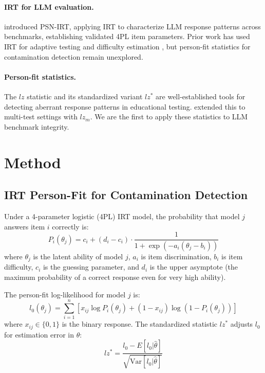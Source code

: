 \documentclass[11pt]{article}
\begin{document}
\paragraph{IRT for LLM evaluation.}
\citet{psnirt2026} introduced PSN-IRT, applying IRT to characterize LLM response patterns across benchmarks, establishing validated 4PL item parameters.
Prior work has used IRT for adaptive testing \citep{zhuang2023efficiently} and difficulty estimation \citep{lalor2019learning}, but person-fit statistics for contamination detection remain unexplored.

\paragraph{Person-fit statistics.}
The $lz$ statistic \citep{drasgow1985appropriateness} and its standardized variant $lz^*$ \citep{snijders2001} are well-established tools for detecting aberrant response patterns in educational testing.
\citet{hong2021} extended this to multi-test settings with $lz_m$.
We are the first to apply these statistics to LLM benchmark integrity.

\section{Method}
\label{sec:method}

\subsection{IRT Person-Fit for Contamination Detection}

Under a 4-parameter logistic (4PL) IRT model, the probability that model $j$ answers item $i$ correctly is:
\begin{equation}
P_i(\theta_j) = c_i + (d_i - c_i) \cdot \frac{1}{1 + \exp(-a_i(\theta_j - b_i))}
\end{equation}
where $\theta_j$ is the latent ability of model $j$, $a_i$ is item discrimination, $b_i$ is item difficulty, $c_i$ is the guessing parameter, and $d_i$ is the upper asymptote (the maximum probability of a correct response even for very high ability).

The person-fit log-likelihood for model $j$ is:
\begin{equation}
l_0(\theta_j) = \sum_{i=1}^{n} \left[ x_{ij} \log P_i(\theta_j) + (1 - x_{ij}) \log(1 - P_i(\theta_j)) \right]
\end{equation}
where $x_{ij} \in \{0,1\}$ is the binary response. The standardized statistic $lz^*$ \citep{snijders2001} adjusts $l_0$ for estimation error in $\theta$:
\begin{equation}
lz^* = \frac{l_0 - E[l_0|\hat{\theta}]}{\sqrt{\text{Var}[l_0|\hat{\theta}]}}
\end{equation}
\end{document}
